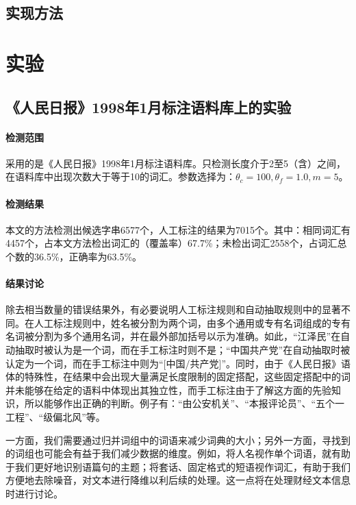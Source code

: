 \documentclass[UTF8]{ctexart}
\begin{document}
\subsection{实现方法}


\section{实验}
\subsection{《人民日报》1998年1月标注语料库上的实验}
\paragraph{检测范围} 采用的是《人民日报》1998年1月标注语料库。只检测长度介于2至5（含）之间，在语料库中出现次数大于等于10的词汇。参数选择为：$\theta_c = 100, \theta_f = 1.0, m = 5$。
\paragraph{检测结果} 本文的方法检测出候选字串6577个，人工标注的结果为7015个。其中：相同词汇有4457个，占本文方法检出词汇的（覆盖率）67.7\%；未检出词汇2558个，占词汇总个数的36.5\%，正确率为63.5\%。
\paragraph{结果讨论} 除去相当数量的错误结果外，有必要说明人工标注规则和自动抽取规则中的显著不同。在人工标注规则中，姓名被分割为两个词，由多个通用或专有名词组成的专有名词被分割为多个通用名词，并在最外部加括号以示为准确。如此，“江泽民”在自动抽取时被认为是一个词，而在手工标注时则不是；“中国共产党”在自动抽取时被认定为一个词，而在手工标注中则为“[中国/共产党]”。同时，由于《人民日报》语体的特殊性，在结果中会出现大量满足长度限制的固定搭配，这些固定搭配中的词并未能够在给定的语料中体现出其独立性，而手工标注由于了解这方面的先验知识，所以能够作出正确的判断。例子有：“由公安机关”、“本报评论员”、“五个一工程”、“级偏北风”等。

一方面，我们需要通过归并词组中的词语来减少词典的大小；另外一方面，寻找到的词组也可能会有益于我们减少数据的维度。例如，将人名视作单个词语，就有助于我们更好地识别语篇句的主题；将套话、固定格式的短语视作词汇，有助于我们方便地去除噪音，对文本进行降维以利后续的处理。这一点将在处理财经文本信息时进行讨论。
\end{document}
